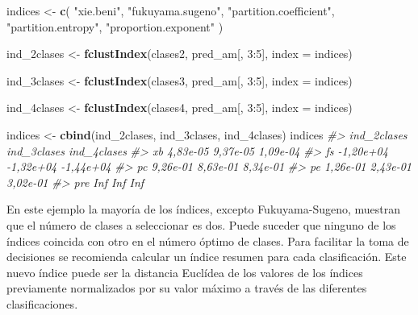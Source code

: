 \documentclass[11pt,b5paper,]{krantz}
\newenvironment{Shaded}{}{}
\newcommand{\CommentTok}[1]{\textcolor[rgb]{0.38,0.63,0.69}{\textit{#1}}}
\newcommand{\DataTypeTok}[1]{\textcolor[rgb]{0.56,0.13,0.00}{#1}}
\newcommand{\DecValTok}[1]{\textcolor[rgb]{0.25,0.63,0.44}{#1}}
\newcommand{\KeywordTok}[1]{\textcolor[rgb]{0.00,0.44,0.13}{\textbf{#1}}}
\newcommand{\NormalTok}[1]{#1}
\newcommand{\OperatorTok}[1]{\textcolor[rgb]{0.40,0.40,0.40}{#1}}
\newcommand{\StringTok}[1]{\textcolor[rgb]{0.25,0.44,0.63}{#1}}
\begin{document}
\begin{Shaded}
\begin{Highlighting}[]
\NormalTok{indices <-}\StringTok{  }\KeywordTok{c}\NormalTok{(}
  \StringTok{"xie.beni"}\NormalTok{,}
  \StringTok{"fukuyama.sugeno"}\NormalTok{,}
  \StringTok{"partition.coefficient"}\NormalTok{,}
  \StringTok{"partition.entropy"}\NormalTok{,}
  \StringTok{"proportion.exponent"}
\NormalTok{)}

\NormalTok{ind_2clases <-}
\StringTok{  }\KeywordTok{fclustIndex}\NormalTok{(clases2,}
\NormalTok{              pred_am[, }\DecValTok{3}\OperatorTok{:}\DecValTok{5}\NormalTok{],}
              \DataTypeTok{index =}\NormalTok{ indices)}

\NormalTok{ind_3clases <-}
\StringTok{  }\KeywordTok{fclustIndex}\NormalTok{(clases3,}
\NormalTok{              pred_am[, }\DecValTok{3}\OperatorTok{:}\DecValTok{5}\NormalTok{],}
              \DataTypeTok{index =}\NormalTok{ indices)}

\NormalTok{ind_4clases <-}
\StringTok{  }\KeywordTok{fclustIndex}\NormalTok{(clases4,}
\NormalTok{              pred_am[, }\DecValTok{3}\OperatorTok{:}\DecValTok{5}\NormalTok{],}
              \DataTypeTok{index =}\NormalTok{ indices)}

\NormalTok{indices <-}\StringTok{ }\KeywordTok{cbind}\NormalTok{(ind_2clases, }
\NormalTok{                 ind_3clases, }
\NormalTok{                 ind_4clases)}
\NormalTok{indices}
\CommentTok{#>     ind_2clases ind_3clases ind_4clases}
\CommentTok{#> xb     4,83e-05    9,37e-05    1,09e-04}
\CommentTok{#> fs    -1,20e+04   -1,32e+04   -1,44e+04}
\CommentTok{#> pc     9,26e-01    8,63e-01    8,34e-01}
\CommentTok{#> pe     1,26e-01    2,43e-01    3,02e-01}
\CommentTok{#> pre         Inf         Inf         Inf}
\end{Highlighting}
\end{Shaded}

En este ejemplo la mayoría de los índices, excepto Fukuyama-Sugeno, muestran que el número de clases a seleccionar es dos. Puede suceder que ninguno de los índices coincida con otro en el número óptimo de clases. Para facilitar la toma de decisiones se recomienda calcular un índice resumen para cada clasificación. Este nuevo índice puede ser la distancia Euclídea de los valores de los índices previamente normalizados por su valor máximo a través de las diferentes clasificaciones.
\end{document}
